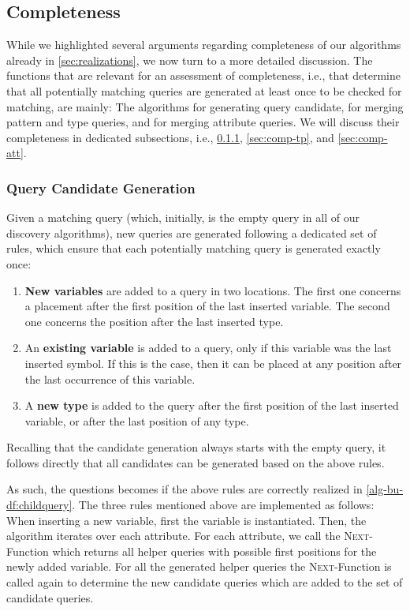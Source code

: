 \subsection{Completeness}

\label{sec:completeness}
While we highlighted several arguments regarding completeness of our
algorithms already in \autoref{sec:realizations}, we now turn to a more
detailed discussion.
The functions that are relevant for an assessment of completeness, i.e.,
that determine that all potentially matching queries are generated at least
once to be checked for matching, are mainly: The algorithms for generating
query candidate, for merging pattern and type queries, and for merging
attribute queries.
We will discuss their completeness in dedicated subsections, i.e.,
\ref{sec:comp-candidates}, \ref{sec:comp-tp}, and \ref{sec:comp-att}.


\subsubsection{Query Candidate Generation}
\label{sec:comp-candidates}
Given a matching query (which, initially, is the empty query in all of our
discovery algorithms), new queries are generated following
a dedicated set of rules, which ensure that each potentially matching query
is generated exactly once:
\begin{enumerate}
	\item \textbf{New variables} are added to a query
	in two locations.  The first one concerns a placement after the first
	position of the last
	inserted variable. The second one concerns the position after the last
	inserted type.
	\item An \textbf{existing variable} is added to a query, only if this
	variable was
	the last inserted symbol. If this is the case, then it can be placed
	at any position after the last occurrence of this variable.
	\item A \textbf{new type} is added to the query  after the first
	position of the last inserted variable, or after the last position
	of any type.
\end{enumerate}
Recalling that the candidate generation always starts with the empty query,
it follows directly that all candidates can be generated based on the above
rules.

As such, the questions becomes if the above rules are correctly realized in
\autoref{alg-bu-df:childquery}. The three rules mentioned
above are implemented as follows: When inserting a new variable, first the
variable is instantiated.
Then, the algorithm iterates over each attribute. For each attribute,
we call the \textsc{Next}-Function which returns all helper queries
with possible first positions for the newly added variable. For all the
generated helper queries the \textsc{Next}-Function is called again
to determine the new candidate queries which are added to the
set of candidate queries.

